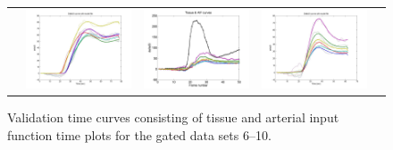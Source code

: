 \documentclass{llncs}
\begin{document}
\begin{figure}
{\begin{tabular}{ccccc}
    \hspace{-5mm} &
    \includegraphics[width=40mm]{Figures/Results_jpg_DZnomask/MoCo_10_DZNoMask_Rest_Fit.jpg} 
    \hspace{-5mm} &
    \includegraphics[width=40mm]{Figures/Results_jpg_DZnomask/MoCo_10_DZNoMask_Stress_Curve.jpg} 
    \hspace{-5mm} &
    \includegraphics[width=40mm]{Figures/Results_jpg_DZnomask/MoCo_10_DZNoMask_Stress_Fit.jpg} \\
  \end{tabular}
  }
  \caption{Validation time curves consisting of tissue and arterial input function time plots 
  for the gated data sets 6--10.}
  \label{fig:gated2}
\end{figure}
    
\end{document}
